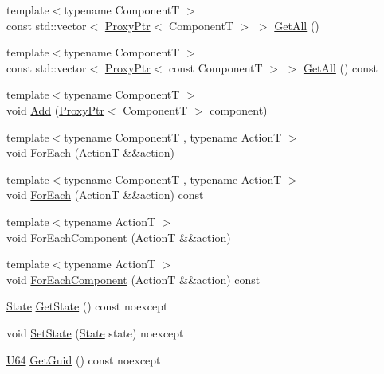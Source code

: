 \begin{DoxyCompactItemize}
\item 
{\footnotesize template$<$typename ComponentT $>$ }\\const std\+::vector$<$ \mbox{\hyperlink{classmage_1_1_proxy_ptr}{Proxy\+Ptr}}$<$ ComponentT $>$ $>$ \mbox{\hyperlink{classmage_1_1_node_aaff260f8a6e8741dc7d56ca1fceb7b0f}{Get\+All}} ()
\item 
{\footnotesize template$<$typename ComponentT $>$ }\\const std\+::vector$<$ \mbox{\hyperlink{classmage_1_1_proxy_ptr}{Proxy\+Ptr}}$<$ const ComponentT $>$ $>$ \mbox{\hyperlink{classmage_1_1_node_a920ff966a7f970189fcbae86025ab3aa}{Get\+All}} () const
\item 
{\footnotesize template$<$typename ComponentT $>$ }\\void \mbox{\hyperlink{classmage_1_1_node_a58452a6195ebea7a1a7a26f9a4dd8102}{Add}} (\mbox{\hyperlink{classmage_1_1_proxy_ptr}{Proxy\+Ptr}}$<$ ComponentT $>$ component)
\item 
{\footnotesize template$<$typename ComponentT , typename ActionT $>$ }\\void \mbox{\hyperlink{classmage_1_1_node_a89df078cbf010b44248a9afd3a65e89d}{For\+Each}} (ActionT \&\&action)
\item 
{\footnotesize template$<$typename ComponentT , typename ActionT $>$ }\\void \mbox{\hyperlink{classmage_1_1_node_a4228ad014440ea626a61cd409f9caf66}{For\+Each}} (ActionT \&\&action) const
\item 
{\footnotesize template$<$typename ActionT $>$ }\\void \mbox{\hyperlink{classmage_1_1_node_a551a6d9590bebdde1499bb28a98fb2c5}{For\+Each\+Component}} (ActionT \&\&action)
\item 
{\footnotesize template$<$typename ActionT $>$ }\\void \mbox{\hyperlink{classmage_1_1_node_abbe2587f1fee0ec98e96fb6ece7c4bb1}{For\+Each\+Component}} (ActionT \&\&action) const
\item 
\mbox{\hyperlink{namespacemage_ae47d13d8477ee94893b9a3947d28eebc}{State}} \mbox{\hyperlink{classmage_1_1_node_a05980bc835cf8da96a9abb225eae72da}{Get\+State}} () const noexcept
\item 
void \mbox{\hyperlink{classmage_1_1_node_a9511a52ddcc0bba71a0353338dcd1d9b}{Set\+State}} (\mbox{\hyperlink{namespacemage_ae47d13d8477ee94893b9a3947d28eebc}{State}} state) noexcept
\item 
\mbox{\hyperlink{namespacemage_a6672cf3c861707ce4a3235a3eb43941d}{U64}} \mbox{\hyperlink{classmage_1_1_node_a69d5c613982a4dfd5175538aff6a07a5}{Get\+Guid}} () const noexcept

\end{DoxyCompactItemize}
